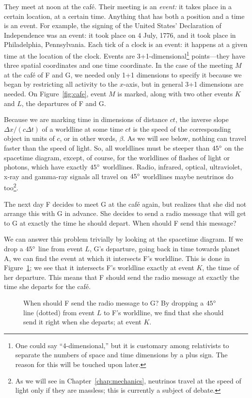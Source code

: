 They meet at noon at the caf\'e.  Their meeting is an {\em event:\/}
it takes place in a certain location, at a certain time.  Anything
that has both a position and a time is an event.  For example, the
signing of the United States' Declaration of Independence was an
event: it took place on 4 July, 1776, and it took place in
Philadelphia, Pennsylvania.  Each tick of a clock is an event: it
happens at a given time at the location of the clock.  Events are
3+1-dimensional\footnote{One could say ``4-dimensional,'' but it is
customary among relativists to separate the numbers of space and time
dimensions by a plus sign.  The reason for this will be touched upon
later.}  points---they have three spatial coordinates and one time
coordinate.  In the case of the meeting $M$ at the caf\'e of F and G,
we needed only 1+1 dimensions to specify it because we began by
restricting all activity to the $x$-axis, but in general 3+1
dimensions are needed.  On Figure~\ref{fig:cafe}, event $M$ is marked,
along with two other events $K$ and $L$, the departures of F and G.

Because we are marking time in dimensions of distance $ct$, the
inverse slope $\Delta x/(c\Delta t)$ of a worldline at some time $ct$
is the speed of the corresponding object in units of $c$, or in other
words, $\beta$.  As we will see below, nothing can travel faster than
the speed of light.  So, all worldlines must be steeper than
$45^{\circ}$ on the spacetime diagram, except, of course, for the
worldlines of flashes of light or photons, which have exactly
$45^{\circ}$ worldlines.  Radio, infrared, optical, ultraviolet, x-ray
and gamma-ray signals all travel on $45^{\circ}$ worldlines maybe
neutrinos do too\footnote{As we will see in
Chapter~\ref{chap:mechanics}, neutrinos travel at the speed of light
only if they are massless; this is currently a subject of debate.}.

\begin{problem}
The next day F decides to meet G at the caf\'e again, but realizes
that she did not arrange this with G in advance.  She decides to send
a radio message that will get to G at exactly the time he should
depart.  When should F send this message?
\end{problem}

We can answer this problem trivially by looking at the spacetime
diagram.  If we drop a $45^{\circ}$ line from event $L$, G's departure,
going back in time towards planet A, we can find the event at which it
intersects F's worldline.  This is done in
Figure~\ref{fig:whentosend}; we see that it intersects F's worldline
exactly at event $K$, the time of her departure.  This means that F
should send the radio message at exactly the time she departs for the
caf\'e.
\begin{figure}
\caption[When should F send the radio message?]{When should F send the
radio message to G?  By dropping a $45^{\circ}$ line (dotted) from
event $L$ to F's worldline, we find that she should send it right when
she departs; at event $K$.}
\label{fig:whentosend}
\end{figure}


